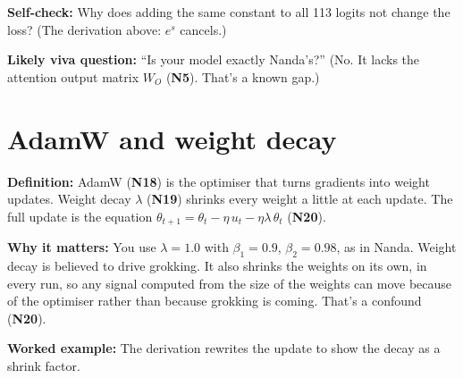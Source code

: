 \documentclass[11pt,a4paper,oneside,openany]{report}
\newcommand{\gl}[1]{\textbf{#1}}   %
\newcommand{\fdef}{\textbf{Definition:} }
\newcommand{\fwhy}{\par\textbf{Why it matters:} }
\newcommand{\fex}{\par\textbf{Worked example:} }
\newcommand{\fself}{\par\textbf{Self-check:} }
\newcommand{\fviva}{\par\textbf{Likely viva question:} }
\begin{document}
\fself Why does adding the same constant to all 113 logits not change the loss? (The derivation above: $e^s$ cancels.)
\fviva ``Is your model exactly Nanda's?'' (No. It lacks the attention output matrix $W_O$ (\gl{N5}). That's a known gap.)

\section{AdamW and weight decay}
\fdef AdamW (\gl{N18}) is the optimiser that turns gradients into weight updates. Weight decay $\lambda$ (\gl{N19}) shrinks every weight a little at each update. The full update is the equation $\theta_{t+1} = \theta_t - \eta\, u_t - \eta\lambda\, \theta_t$ (\gl{N20}).
\fwhy You use $\lambda = 1.0$ with $\beta_1 = 0.9$, $\beta_2 = 0.98$, as in Nanda. Weight decay is believed to drive grokking. It also shrinks the weights on its own, in every run, so any signal computed from the size of the weights can move because of the optimiser rather than because grokking is coming. That's a confound (\gl{N20}).
\fex The derivation rewrites the update to show the decay as a shrink factor.
\end{document}
